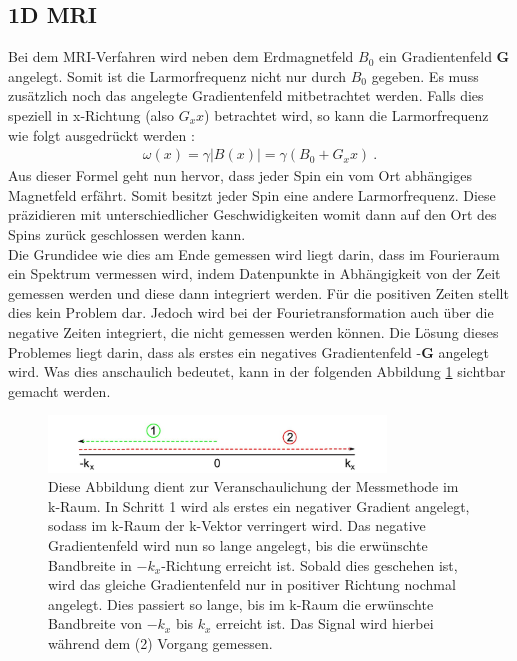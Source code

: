 \subsection{1D MRI}
\label{sec:1DMRIkapitel}
Bei dem MRI-Verfahren wird neben dem Erdmagnetfeld $B_0$ ein Gradientenfeld \textbf{G} angelegt.
Somit ist die Larmorfrequenz nicht nur durch $B_0$ gegeben.
Es muss zusätzlich noch das angelegte Gradientenfeld mitbetrachtet werden.
Falls dies speziell in x-Richtung (also $G_xx$) betrachtet wird, so kann die Larmorfrequenz wie folgt ausgedrückt werden \cite{Schmidt}:
\begin{align}
    \omega(x)=\gamma |B(x)|= \gamma \left(B_0+G_xx\right) \ .
    \label{eq:gradientlarmor}
\end{align}
Aus dieser Formel geht nun hervor, dass jeder Spin ein vom Ort abhängiges Magnetfeld erfährt.
Somit besitzt jeder Spin eine andere Larmorfrequenz.
Diese präzidieren mit unterschiedlicher Geschwidigkeiten womit dann auf den Ort des Spins zurück geschlossen werden kann. \\

Die Grundidee wie dies am Ende gemessen wird liegt darin, dass im Fourieraum ein Spektrum vermessen wird, indem Datenpunkte in Abhängigkeit von der Zeit gemessen werden und diese dann integriert werden.
Für die positiven Zeiten stellt dies kein Problem dar.
Jedoch wird bei der Fourietransformation auch über die negative Zeiten integriert, die nicht gemessen werden können.
Die Lösung dieses Problemes liegt darin, dass als erstes ein negatives Gradientenfeld -\textbf{G} angelegt wird.
Was dies anschaulich bedeutet, kann in der folgenden Abbildung \ref{fig:1DMRI} sichtbar gemacht werden.  
\begin{figure}[H]
    \centering
    \includegraphics[width=0.8\textwidth]{Abbildungen/1DMRIkraum.JPG}
    \caption[Veranschaulichter Verlauf des k-Vektors im 1D-MRI]{Diese Abbildung dient zur Veranschaulichung der Messmethode im k-Raum.
    In Schritt 1 wird als erstes ein negativer Gradient angelegt, sodass im k-Raum der k-Vektor verringert wird.
    Das negative Gradientenfeld wird nun so lange angelegt, bis die erwünschte Bandbreite in $-k_{x}$-Richtung erreicht ist.
    Sobald dies geschehen ist, wird das gleiche Gradientenfeld nur in positiver Richtung nochmal angelegt.
    Dies passiert so lange,  bis im k-Raum die erwünschte Bandbreite von $-k_{x}$ bis $k_{x}$ erreicht ist.
    Das Signal wird hierbei während dem (2) Vorgang gemessen. \cite{Schmidt}}
    \label{fig:1DMRI}
\end{figure}

